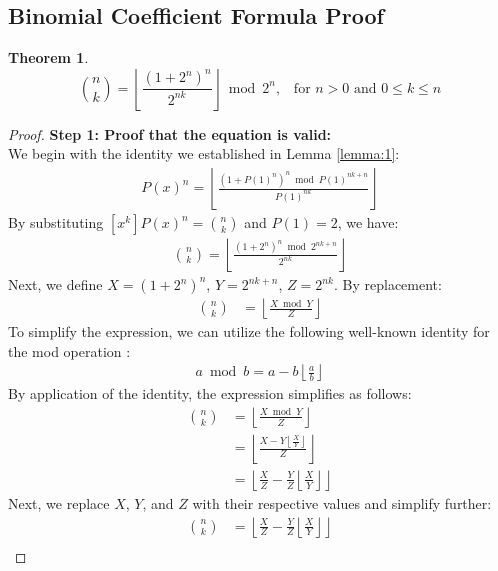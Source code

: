 \documentclass{article}
\theoremstyle{plain}
\theoremstyle{definition}
\newtheorem{thm}{Theorem}
\begin{document}
\subsection[Binomial Coefficient Formula Proof]{Binomial Coefficient Formula Proof}
\begin{thm}
\label{thm:2}
\begin{equation}
    \binom{n}{k} = \left\lfloor\frac{(1 + 2^{n})^{n}}{2^{n k}}\right\rfloor \bmod{2^{n}} \text{,} \quad \text{for } n > 0 \text{ and } 0 \leq k \leq n
\end{equation}
\end{thm}
\begin{proof}
\textbf{Step 1: Proof that the equation is valid:} \\
We begin with the identity we established in Lemma \ref{lemma:1}:
\begin{align}
    [x^k] P(x)^{n} = \left\lfloor\frac{(1 + P(1)^{n})^{n} \bmod P(1)^{n k + n}}{P(1)^{n k}}\right\rfloor
\end{align}
By substituting $[x^k] P(x)^{n} = \binom{n}{k}$ and $P(1) = 2$, we have: 
\begin{align}
\label{equation:timecomplexity}
    \binom{n}{k} = \left\lfloor\frac{(1 + 2^{n})^{n} \bmod 2^{n k + n}}{2^{n k}}\right\rfloor
\end{align}
Next, we define $X = (1 + 2^{n})^{n}$, $Y = 2^{n k + n}$, $Z = 2^{n k}$. By replacement:
\begin{align}
    \binom{n}{k} &= \left\lfloor\frac{X \bmod Y}{Z}\right\rfloor
\end{align}
To simplify the expression, we can utilize the following well-known identity for the mod operation \cite{niven2008introduction}:
\begin{align}
\label{modidentity}
    a \bmod{b} = a - b \left\lfloor \frac{a}{b} \right\rfloor
\end{align}
By application of the identity, the expression simplifies as follows:
\begin{align}
    \binom{n}{k} &= \left\lfloor\frac{X \bmod Y}{Z}\right\rfloor\\ &= \left\lfloor\frac{X - Y \left\lfloor \frac{X}{Y} \right\rfloor}{Z}\right\rfloor\\ &= \left\lfloor\frac{X}{Z} - \frac{Y}{Z} \left\lfloor \frac{X}{Y} \right\rfloor\right\rfloor
\end{align}
Next, we replace $X$, $Y$, and $Z$ with their respective values and simplify further:
\begin{align}
    \binom{n}{k} &= \left\lfloor\frac{X}{Z} - \frac{Y}{Z} \left\lfloor \frac{X}{Y} \right\rfloor\right\rfloor \\ 

\end{align}
\end{proof}
\end{document}
